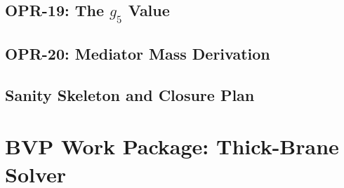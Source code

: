 \documentclass[11pt,a4paper]{book}
\theoremstyle{definition}
\theoremstyle{remark}
\begin{document}
\section{OPR-19: The $g_5$ Value}






\section{OPR-20: Mediator Mass Derivation}












\section{Sanity Skeleton and Closure Plan}



\chapter*{BVP Work Package: Thick-Brane Solver}
\label{ch:bvp_workpackage}
\end{document}
